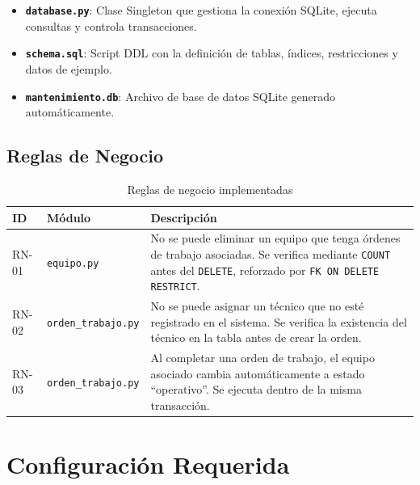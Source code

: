 \documentclass[12pt, a4paper]{article}
\begin{document}
\begin{itemize}[leftmargin=2em]
    \item \textbf{\texttt{database.py}}: Clase Singleton que gestiona la conexión SQLite, ejecuta consultas y controla transacciones.
    \item \textbf{\texttt{schema.sql}}: Script DDL con la definición de tablas, índices, restricciones y datos de ejemplo.
    \item \textbf{\texttt{mantenimiento.db}}: Archivo de base de datos SQLite generado automáticamente.
\end{itemize}

\subsection{Reglas de Negocio}

\begin{table}[H]
    \centering
    \begin{tabularx}{\textwidth}{l l X}
        \toprule
        \textbf{ID} & \textbf{Módulo} & \textbf{Descripción} \\
        \midrule
        RN-01 & \texttt{equipo.py} & No se puede eliminar un equipo que tenga órdenes de trabajo asociadas. Se verifica mediante \texttt{COUNT} antes del \texttt{DELETE}, reforzado por \texttt{FK ON DELETE RESTRICT}. \\
        \addlinespace
        RN-02 & \texttt{orden\_trabajo.py} & No se puede asignar un técnico que no esté registrado en el sistema. Se verifica la existencia del técnico en la tabla antes de crear la orden. \\
        \addlinespace
        RN-03 & \texttt{orden\_trabajo.py} & Al completar una orden de trabajo, el equipo asociado cambia automáticamente a estado ``operativo''. Se ejecuta dentro de la misma transacción. \\
        \bottomrule
    \end{tabularx}
    \caption{Reglas de negocio implementadas}
\end{table}

\newpage
\section{Configuración Requerida}
\end{document}
